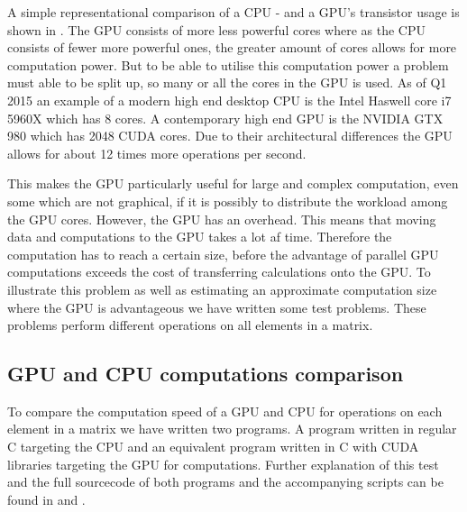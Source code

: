 A simple representational comparison of a CPU - and a GPU's transistor usage is shown in .
The GPU consists of more less powerful cores where as the CPU consists of fewer more powerful ones, the greater amount of cores allows for more computation power.
But to be able to utilise this computation power a problem must able to be split up, so many or all the cores in the GPU is used.
As of Q1 2015 an example of a modern high end desktop CPU is the Intel Haswell core i7 5960X which has 8 cores. \citep{puget}
A contemporary high end GPU is the NVIDIA GTX 980 which has 2048 CUDA cores. \citep{techpowerup,gtx980}
Due to their architectural differences the GPU allows for about 12 times more operations per second.

This makes the GPU particularly useful for large and complex computation, even some which are not graphical, if it is possibly to distribute the workload among the GPU cores.
However, the GPU has an overhead.
This means that moving data and computations to the GPU takes a lot af time.
Therefore the computation has to reach a certain size, before the advantage of parallel GPU computations exceeds the cost of transferring calculations onto the GPU.
To illustrate this problem as well as estimating an approximate computation size where the GPU is advantageous we have written some test problems. 
These problems perform different operations on all elements in a matrix. 

\subsection{GPU and CPU computations comparison}
To compare the computation speed of a GPU and CPU for operations on each element in a matrix we have written two programs.
A program written in regular C targeting the CPU and an equivalent program written in C with CUDA libraries targeting the GPU for computations.
Further explanation of this test and the full sourcecode of both programs and the accompanying scripts can be found in  and .

